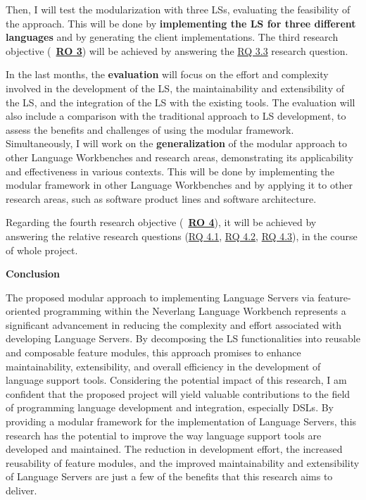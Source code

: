Then, I will test the modularization with three LSs, evaluating the feasibility of the approach. This will be done by \textbf{implementing the LS for three different languages} and by generating the client implementations. The third research objective (~\hyperlink{ro3}{\textbf{RO 3}}) will be achieved by answering the \hyperlink{rq33}{\textsf{RQ 3.3}} research question.

In the last months, the \textbf{evaluation} will focus on the effort and complexity involved in the development of the LS, the maintainability and extensibility of the LS, and the integration of the LS with the existing tools. The evaluation will also include a comparison with the traditional approach to LS development, to assess the benefits and challenges of using the modular framework.
Simultaneously, I will work on the \textbf{generalization} of the modular approach to other Language Workbenches and research areas, demonstrating its applicability and effectiveness in various contexts. This will be done by implementing the modular framework in other Language Workbenches and by applying it to other research areas, such as software product lines and software architecture.

Regarding the fourth research objective (~\hyperlink{ro4}{\textbf{RO 4}}), it will be achieved by answering the relative research questions (\hyperlink{rq41}{\textsf{RQ 4.1}}, \hyperlink{rq42}{\textsf{RQ 4.2}}, \hyperlink{rq43}{\textsf{RQ 4.3}}), in the course of whole project.

\hfill \break
\noindent
\textbf{Conclusion}

The proposed modular approach to implementing Language Servers via feature-oriented programming within the Neverlang Language Workbench represents a significant advancement in reducing the complexity and effort associated with developing Language Servers. By decomposing the LS functionalities into reusable and composable feature modules, this approach promises to enhance maintainability, extensibility, and overall efficiency in the development of language support tools.
Considering the potential impact of this research, I am confident that the proposed project will yield valuable contributions to the field of programming language development and integration, especially DSLs. By providing a modular framework for the implementation of Language Servers, this research has the potential to improve the way language support tools are developed and maintained. The reduction in development effort, the increased reusability of feature modules, and the improved maintainability and extensibility of Language Servers are just a few of the benefits that this research aims to deliver.
